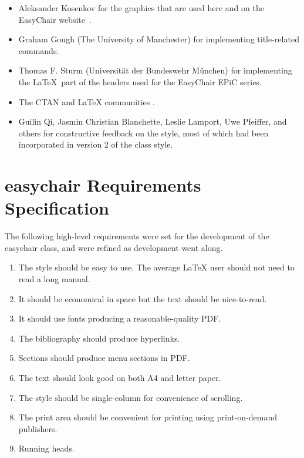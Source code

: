 \documentclass{easychair}
\newcommand{\easychair}{\textsf{easychair}}
\begin{document}
\begin{itemize}
\item
Aleksander Kosenkov for the graphics that are used here and on the EasyChair 
website~\cite{easychair}.

\item
Graham Gough (The University of Manchester) for implementing title-related
commands.

\item
Thomas F. Sturm (Universit\"at der Bundeswehr M\"unchen) for implementing the
\LaTeX\ part of the headers used for the EasyChair EPiC series.

\item
The CTAN \cite{ctan} and {\LaTeX} communities \cite{texniccenter,miktex}.

\item
Guilin Qi, Jasmin Christian Blanchette, Leslie Lamport, Uwe Pfeiffer,
and others for constructive feedback on the style, most of which had been
incorporated in version 2 of the class style.
\end{itemize}

\label{sect:bib}

%
%
%


\appendix
\section{{\easychair} Requirements Specification}
\label{sect:easychair-requirements}

The following high-level requirements were set for the development of 
the {\easychair} class, and were refined as development went along.

\begin{enumerate}
\item
The style should be easy to use. 
The average {\LaTeX} user should not need to read a long manual.

\item
It should be economical in space but the text should be nice-to-read.

\item
It should use fonts producing a reasonable-quality PDF.

\item
The bibliography should produce hyperlinks.

\item
Sections should produce menu sections in PDF.

\item
The text should look good on both A4 and letter paper.

\item
The style should be single-column for convenience of scrolling.

\item
The print area should be convenient for printing using print-on-demand publishers.

\item
Running heads.
\end{enumerate}


\end{document}
